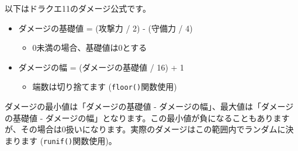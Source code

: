 \documentclass[
  a4paper,
  pandoc,
  ja=standard,
  jafont=haranoaji]{bxjsbook}
\providecommand{\tightlist}{%
  \setlength{\itemsep}{0pt}\setlength{\parskip}{0pt}}
\begin{document}
以下はドラクエ11のダメージ公式です。

\begin{itemize}
\tightlist
\item
  ダメージの基礎値 = (攻撃力 / 2) - (守備力 / 4)

  \begin{itemize}
  \tightlist
  \item
    0未満の場合、基礎値は0とする
  \end{itemize}
\item
  ダメージの幅 = (ダメージの基礎値 / 16) + 1

  \begin{itemize}
  \tightlist
  \item
    端数は切り捨てます (\texttt{floor()}関数使用)
  \end{itemize}
\end{itemize}

ダメージの最小値は「ダメージの基礎値 -
ダメージの幅」、最大値は「ダメージの基礎値 -
ダメージの幅」となります。この最小値が負になることもありますが、その場合は0扱いになります。実際のダメージはこの範囲内でランダムに決まります
(\texttt{runif()}関数使用)。
\end{document}
